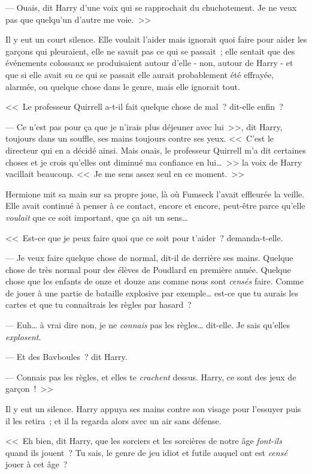 --- Ouais, dit Harry d'une voix qui se rapprochait du chuchotement. Je ne veux pas que quelqu'un d'autre me voie.~>>

Il y eut un court silence. Elle voulait l'aider mais ignorait quoi faire pour aider les garçons qui pleuraient, elle ne savait pas ce qui se passait~; elle sentait que des événements colossaux se produisaient autour d'elle - non, autour de Harry - et que si elle avait su ce qui se passait elle aurait probablement été effrayée, alarmée, ou quelque chose dans le genre, mais elle ignorait tout.

<<~Le professeur Quirrell a-t-il fait quelque chose de mal~? dit-elle enfin~?

--- Ce n'est pas pour ça que je n'irais plus déjeuner avec lui~>>, dit Harry, toujours dans un souffle, ses mains toujours contre ses yeux. <<~C'est le directeur qui en a décidé ainsi. Mais ouais, le professeur Quirrell m'a dit certaines choses et je crois qu'elles ont diminué ma confiance en lui…~>> la voix de Harry vacillait beaucoup. <<~Je me sens assez seul en ce moment.~>>

Hermione mit sa main sur sa propre joue, là où Fumseck l'avait effleurée la veille. Elle avait continué à penser à ce contact, encore et encore, peut-être parce qu'elle \emph{voulait} que ce soit important, que ça ait un sens…

<<~Est-ce que je peux faire quoi que ce soit pour t'aider~? demanda-t-elle.

--- Je veux faire quelque chose de normal, dit-il de derrière ses mains. Quelque chose de très normal pour des élèves de Poudlard en première année. Quelque chose que les enfants de onze et douze ans comme nous sont \emph{censés} faire. Comme de jouer à une partie de bataille explosive par exemple… est-ce que tu aurais les cartes et que tu connaîtrais les règles par hasard~?

--- Euh… à vrai dire non, je ne \emph{connais} pas les règles… dit-elle. Je sais qu'elles \emph{explosent}.

--- Et des Bavboules~? dit Harry.

--- Connais pas les règles, et elles te \emph{crachent} dessus. Harry, ce sont des jeux de garçon~!~>>

Il y eut un silence. Harry appuya ses mains contre son visage pour l'essuyer puis il les retira~; et il la regarda alors avec un air sans défense.

<<~Eh bien, dit Harry, que les sorciers et les sorcières de notre âge \emph{font-ils} quand ils jouent~? Tu sais, le genre de jeu idiot et futile auquel ont est \emph{censé} jouer à cet âge~?

